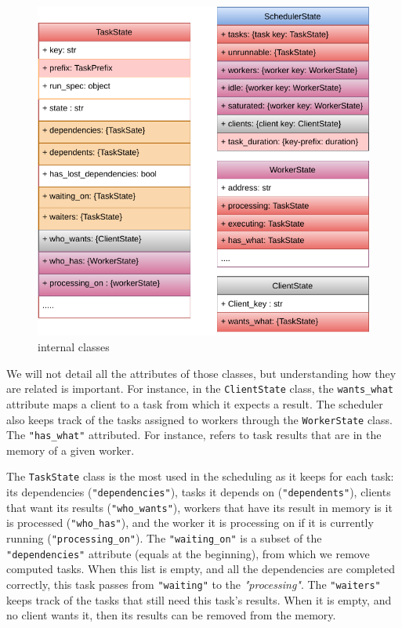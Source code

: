 \begin{figure}[h!]\centering
\includegraphics{figures/DaskScheduler.pdf}
\caption{\dask internal classes}
\label{figdaskinternal}
\end{figure}

We will not detail all the attributes of those classes, but understanding how they are related is important. 
For instance, in the \texttt{ClientState} class, the \texttt{wants\_what} attribute maps a client to a task from which it expects a result. The scheduler also keeps track of the tasks assigned to workers through the \texttt{WorkerState} class. The \texttt{"has\_what"} attributed. For instance, refers to task results that are in the memory of a given worker. 

The \texttt{TaskState} class is the most used in the scheduling as it keeps for each task: its dependencies (\texttt{"dependencies"}), tasks it depends on (\texttt{"dependents"}), clients that want its results (\texttt{"who\_wants"}), workers that have its result in memory is it is processed (\texttt{"who\_has"}), and the worker it is processing on if it is currently running (\texttt{"processing\_on"}). The \texttt{"waiting\_on"} is a subset of the \texttt{"dependencies"} attribute (equals at the beginning), from which we remove computed tasks. When this list is empty, and all the dependencies are completed correctly, this task passes from \texttt{"waiting"} to the \textit{"processing"}. 
The \texttt{"waiters"} keeps track of the tasks that still need this task's results. When it is empty, and no client wants it, then its results can be removed from the \dask memory.  


